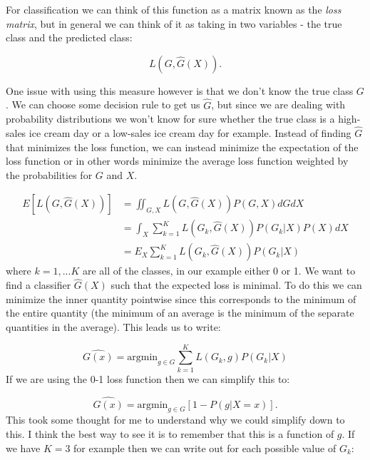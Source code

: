 \documentclass[paper=a4, fontsize=11pt]{scrartcl} %
\numberwithin{equation}{section} %
\numberwithin{figure}{section} %
\numberwithin{table}{section} %
\begin{document}
For classification we can think of this function as a matrix known as the \emph{loss matrix}, but in general we can think of it as taking in two variables - the true class and the predicted class:

\begin{equation}
L(G, \hat{G}(X)).
\end{equation}

One issue with using this measure however is that we don't know the true class $G$. We can choose some decision rule to get us $\hat{G}$, but since we are dealing with probability distributions we won't know for sure whether the true class is a high-sales ice cream day or a low-sales ice cream day for example. Instead of finding $\hat{G}$ that minimizes the loss function, we can instead minimize the expectation of the loss function or in other words minimize the average loss function weighted by the probabilities for $G$ and $X$.

\begin{equation}
\begin{split}
E[L(G, \hat{G}(X))] & = \iint_{G, X} {L(G, \hat{G}(X)) P(G, X) dG dX} \\
& = \int_{X} \sum_{k=1}^{K} {L(G_k, \hat{G}(X)) P(G_k|X) P(X) dX} \\
&= E_{X} \sum_{k=1}^{K} {L(G_k, \hat{G}(X)) P(G_k|X)}
\end{split}
\end{equation}
where $k=1,...K$ are all of the classes, in our example either 0 or 1. We want to find a classifier $\hat{G}(X)$ such that the expected loss is minimal. To do this we can minimize the inner quantity pointwise since this corresponds to the minimum of the entire quantity (the minimum of an average is the minimum of the separate quantities in the average). This leads us to write:

\begin{equation}
\hat{G(x)} = \text{argmin}_{g \in G} \sum_{k=1}^{K} {L(G_k, g) P(G_k|X)}
\end{equation}
If we are using the 0-1 loss function then we can simplify this to:

\begin{equation}
\hat{G(x)} = \text{argmin}_{g \in G} \left[1 - P(g|X=x) \right].
\end{equation}
This took some thought for me to understand why we could simplify down to this. I think the best way to see it is to remember that this is a function of $g$. If we have $K=3$ for example then we can write out for each possible value of $G_k$:
\end{document}
